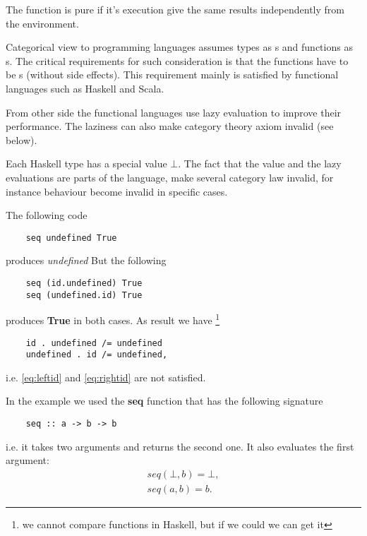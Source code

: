 \begin{definition}
\label{def:pure_function}
The function is pure if it's execution give the same results
independently from the environment. 
\end{definition}

Categorical view to programming languages assumes types as
s and functions as
s. The critical requirements for such
consideration is that the functions have to be
s (without side effects). This requirement
mainly is satisfied by functional languages such as Haskell and Scala.

From other side the functional languages use lazy evaluation to
improve their performance. The laziness can also make category theory
axiom invalid (see  below). 

\begin{remark}
  \label{rem:hask_lazy_eval}
  Each Haskell type has a special value $\bot$. The fact that the
  value and the lazy evaluations are parts of the language, make several
  category law invalid, for instance 
   behaviour become invalid in specific cases.

  The following code
  \begin{verbatim}
    seq undefined True
  \end{verbatim}
  produces \textit{undefined}
  But the following
  \begin{verbatim}
    seq (id.undefined) True
    seq (undefined.id) True
  \end{verbatim}
  produces \textbf{True} in both cases.
  As result we have
  \footnote{we cannot compare functions in Haskell, but if we
  could we can get it}
  \begin{verbatim}
    id . undefined /= undefined
    undefined . id /= undefined,
  \end{verbatim}
  i.e. \eqref{eq:leftid} and
  \eqref{eq:rightid} are not satisfied.  

  In the example we used the \textbf{seq} function that has the
  following signature 
  \begin{verbatim}
    seq :: a -> b -> b
  \end{verbatim}  
  i.e. it takes two arguments and returns the second one. It also
  evaluates the first argument:
  \begin{eqnarray}
    seq(\bot, b) = \bot,
    \nonumber \\
    seq(a, b) = b.
    \nonumber
  \end{eqnarray}
\end{remark}

